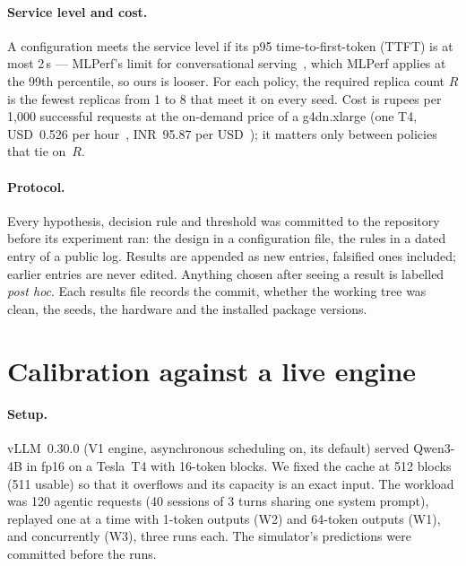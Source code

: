\documentclass[10pt,twocolumn]{article}
\begin{document}
\paragraph{Service level and cost.} A configuration meets the service level if its p95
time-to-first-token (TTFT) is at most 2\,s --- MLPerf's limit for conversational
serving~\cite{mlperf}, which MLPerf applies at the 99th percentile, so ours is looser. For each
policy, the required replica count $R$ is the fewest replicas from 1 to 8 that meet it on every seed.
Cost is rupees per 1{,}000 successful requests at the on-demand price of a g4dn.xlarge (one T4,
USD~0.526 per hour~\cite{awsprice}, INR~95.87 per USD~\cite{fedh10}); it matters only between policies
that tie on~$R$.

\paragraph{Protocol.} Every hypothesis, decision rule and threshold was committed to the repository
before its experiment ran: the design in a configuration file, the rules in a dated entry of a public
log. Results are appended as new entries, falsified ones included; earlier entries are never edited.
Anything chosen after seeing a result is labelled \emph{post hoc}. Each results file records the
commit, whether the working tree was clean, the seeds, the hardware and the installed package
versions.

\section{Calibration against a live engine}\label{sec:calibration}

\paragraph{Setup.} vLLM~0.30.0 (V1 engine, asynchronous scheduling on, its default) served Qwen3-4B in
fp16 on a Tesla~T4 with 16-token blocks. We fixed the cache at 512 blocks (511 usable) so that it
overflows and its capacity is an exact input. The workload was 120 agentic requests (40 sessions of 3
turns sharing one system prompt), replayed one at a time with 1-token outputs (W2) and 64-token
outputs (W1), and concurrently (W3), three runs each. The simulator's predictions were committed
before the runs.
\end{document}

